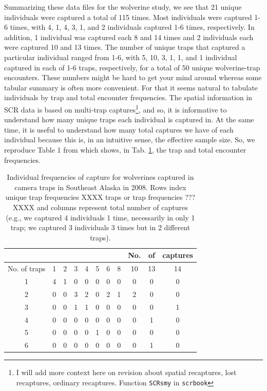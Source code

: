 Summarizing these data files for the wolverine study, we see that 21
unique individuals were captured a total of 115 times. Most
individuals were captured 1-6 times, with 4, 1, 4, 3, 1, and 2
individuals captured 1-6 times, respectively.  In addition, 1
individual was captured each 8 and 14 times and 2 individuals each
were captured 10 and 13 times.  The number of unique traps that
captured a particular individual ranged from 1-6, with 5, 10, 3, 1, 1,
and 1 individual captured in each of 1-6 traps, respectively, for a
total of 50 unique wolverine-trap encounters.  These numbers might be
hard to get your mind around whereas some tabular summary is often
more convenient. For that it seems natural to tabulate individuals by
trap and total encounter frequencies. The spatial information in SCR
data is based on multi-trap captures\footnote{I will add more context
  here on revision about spatial recaptures, lost recaptures, ordinary
  recaptures. Function \mbox{\tt SCRsmy} in \mbox{\tt scrbook}}, and
so, it is informative to understand how many unique traps each
individual is captured in. At the same time, it is useful to
understand how many total captures we have of each individual because
this is, in an intuitive sense, the effective sample size.  So, we
reproduce Table 1 from \citet{royle_etal:2011jwm} which shows, 
in Tab. \ref{scr0.tab.wolverine}, the trap
and total encounter frequencies.

\begin{table} [htp]
  \caption{Individual frequencies of capture for wolverines captured
    in camera traps in Southeast Alaska in 2008. Rows index unique
    trap frequencies XXXX traps or trap frequencies ??? XXXX
and columns represent total number of captures
    (e.g., we captured 4 individuals 1 time, necessarily in only 1
    trap; we captured 3 individuals 3 times but in 2 different traps).
}
\centering
\begin{tabular}{c c c c c c c c c c c}
\hline
 & & & & & & & &  No.&of&captures \\
\hline
No. of traps & 1 & 2 & 3 & 4 & 5 & 6 & 8 & 10 &13 &14 \\
\hline
1 & 4 & 1 & 0 & 0 & 0 & 0 & 0 & 0 & 0 & 0 \\
2 & 0 & 0 & 3 & 2 & 0 & 2 & 1 & 2 & 0 & 0 \\
3 & 0 & 0 & 1 & 1 & 0 & 0 & 0 & 0 & 0 & 1 \\
4 & 0 & 0 & 0 & 0 & 0 & 0 & 0 & 0 & 1 & 0 \\
5 & 0 & 0 & 0 & 0 & 1 & 0 & 0 & 0 & 0 & 0 \\
6 & 0 & 0 & 0 & 0 & 0 & 0 & 0 & 0 & 1 & 0 \\
\hline
\end{tabular}
\label{scr0.tab.wolverine}
\end{table}


